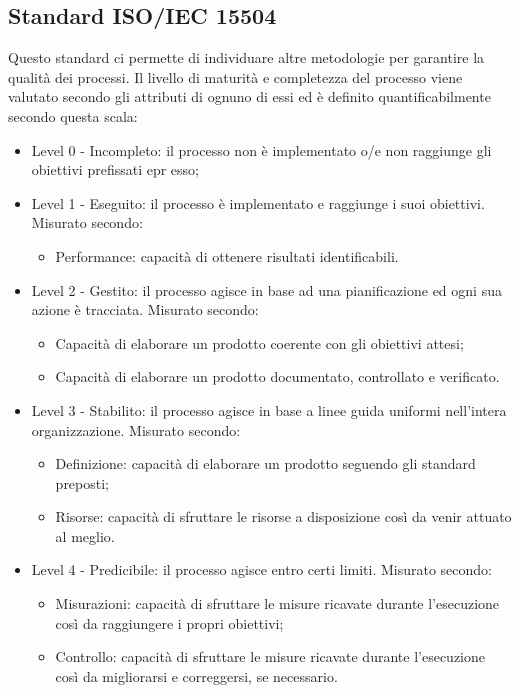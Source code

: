 \subsection{Standard ISO/IEC 15504}
Questo standard ci permette di individuare altre metodologie per garantire la qualità dei processi.
Il livello di maturità e completezza del processo viene valutato secondo gli attributi di ognuno di essi ed è definito quantificabilmente secondo questa scala:
\begin{itemize}
			\item Level 0 - Incompleto: il processo non è implementato o/e non raggiunge gli obiettivi prefissati epr esso;
			\item Level 1 - Eseguito: il processo è implementato e raggiunge i suoi obiettivi.
			Misurato secondo:
				\begin{itemize}
					\item Performance: capacità di ottenere risultati identificabili.
				\end{itemize}
			\item Level 2 - Gestito: il processo agisce in base ad una pianificazione ed ogni sua azione è tracciata.
			Misurato secondo:
				\begin{itemize}
					\item Capacità di elaborare un prodotto coerente con gli obiettivi attesi;
					\item Capacità di elaborare un prodotto documentato, controllato e verificato.
				\end{itemize}
			\item Level 3 - Stabilito: il processo agisce in base a linee guida uniformi nell'intera organizzazione.
			Misurato secondo:
				\begin{itemize}
					\item Definizione: capacità di elaborare un prodotto seguendo gli standard preposti;
					\item Risorse: capacità di sfruttare le risorse a disposizione così da venir attuato al meglio.
				\end{itemize}
			\item Level 4 - Predicibile: il processo agisce entro certi limiti.
			Misurato secondo:
				\begin{itemize}
					\item Misurazioni: capacità di sfruttare le misure ricavate durante l'esecuzione così da raggiungere i propri obiettivi;
					\item Controllo: capacità di sfruttare le misure ricavate durante l'esecuzione così da migliorarsi e correggersi, se necessario.

\end{itemize}
\end{itemize}
